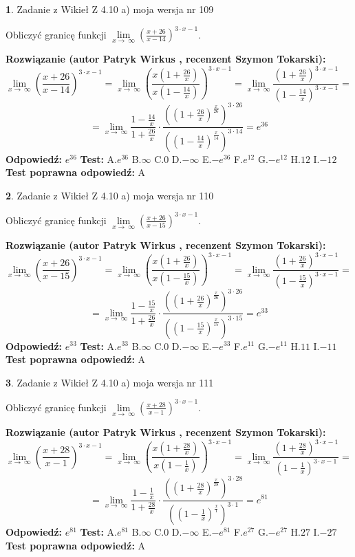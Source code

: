 \documentclass[12pt, a4paper]{article}
\theoremstyle{definition} %
\newtheorem{zad}{}
\newcommand{\zadStart}[1]{\begin{zad}#1\newline}
\newcommand{\zadStop}{\end{zad}}
\newcommand{\rozwStart}[2]{\noindent \textbf{Rozwiązanie (autor #1 , recenzent #2): }\newline}
\newcommand{\rozwStop}{\newline}
\newcommand{\odpStart}{\noindent \textbf{Odpowiedź:}\newline}
\newcommand{\odpStop}{\newline}
\newcommand{\testStart}{\noindent \textbf{Test:}\newline}
\newcommand{\testStop}{\newline}
\newcommand{\kluczStart}{\noindent \textbf{Test poprawna odpowiedź:}\newline}
\newcommand{\kluczStop}{\newline}
\begin{document}
\zadStart{Zadanie z Wikieł Z 4.10 a) moja wersja nr 109}

Obliczyć granicę funkcji  $\lim\limits_{x\to\ \infty}(\frac{x+26}{x-14})^{3\cdot x-1}$.
\zadStop
\rozwStart{Patryk Wirkus}{Szymon Tokarski}
$$\lim\limits_{x\to\ \infty}(\frac{x+26}{x-14})^{3\cdot x-1} = \lim\limits_{x\to\ \infty}(\frac{x(1+\frac{26}{x})}{x(1-\frac{14}{x})})^{3\cdot x-1}=\lim\limits_{x\to\ \infty}\frac{(1+\frac{26}{x})^{3\cdot x-1}}{(1-\frac{14}{x})^{3\cdot x-1}}=$$
$$=\lim\limits_{x\to\ \infty}\frac{1-\frac{14}{x}}{1+\frac{26}{x}}\cdot\frac{((1+\frac{26}{x})^{\frac{x}{26}})^{3\cdot26}}{((1-\frac{14}{x})^{\frac{x}{14}})^{3\cdot14}}=e^{36}$$
\rozwStop
\odpStart
$e^{36}$
\odpStop
\testStart
A.$e^{36}$ B.$\infty$ C.$0$ D.$-\infty$ E.$-e^{36}$
F.$e^{12}$ G.$-e^{12}$
H.$12$
I.$-12$
\testStop
\kluczStart
A
\kluczStop



\zadStart{Zadanie z Wikieł Z 4.10 a) moja wersja nr 110}

Obliczyć granicę funkcji  $\lim\limits_{x\to\ \infty}(\frac{x+26}{x-15})^{3\cdot x-1}$.
\zadStop
\rozwStart{Patryk Wirkus}{Szymon Tokarski}
$$\lim\limits_{x\to\ \infty}(\frac{x+26}{x-15})^{3\cdot x-1} = \lim\limits_{x\to\ \infty}(\frac{x(1+\frac{26}{x})}{x(1-\frac{15}{x})})^{3\cdot x-1}=\lim\limits_{x\to\ \infty}\frac{(1+\frac{26}{x})^{3\cdot x-1}}{(1-\frac{15}{x})^{3\cdot x-1}}=$$
$$=\lim\limits_{x\to\ \infty}\frac{1-\frac{15}{x}}{1+\frac{26}{x}}\cdot\frac{((1+\frac{26}{x})^{\frac{x}{26}})^{3\cdot26}}{((1-\frac{15}{x})^{\frac{x}{15}})^{3\cdot15}}=e^{33}$$
\rozwStop
\odpStart
$e^{33}$
\odpStop
\testStart
A.$e^{33}$ B.$\infty$ C.$0$ D.$-\infty$ E.$-e^{33}$
F.$e^{11}$ G.$-e^{11}$
H.$11$
I.$-11$
\testStop
\kluczStart
A
\kluczStop



\zadStart{Zadanie z Wikieł Z 4.10 a) moja wersja nr 111}

Obliczyć granicę funkcji  $\lim\limits_{x\to\ \infty}(\frac{x+28}{x-1})^{3\cdot x-1}$.
\zadStop
\rozwStart{Patryk Wirkus}{Szymon Tokarski}
$$\lim\limits_{x\to\ \infty}(\frac{x+28}{x-1})^{3\cdot x-1} = \lim\limits_{x\to\ \infty}(\frac{x(1+\frac{28}{x})}{x(1-\frac{1}{x})})^{3\cdot x-1}=\lim\limits_{x\to\ \infty}\frac{(1+\frac{28}{x})^{3\cdot x-1}}{(1-\frac{1}{x})^{3\cdot x-1}}=$$
$$=\lim\limits_{x\to\ \infty}\frac{1-\frac{1}{x}}{1+\frac{28}{x}}\cdot\frac{((1+\frac{28}{x})^{\frac{x}{28}})^{3\cdot28}}{((1-\frac{1}{x})^{\frac{x}{1}})^{3\cdot1}}=e^{81}$$
\rozwStop
\odpStart
$e^{81}$
\odpStop
\testStart
A.$e^{81}$ B.$\infty$ C.$0$ D.$-\infty$ E.$-e^{81}$
F.$e^{27}$ G.$-e^{27}$
H.$27$
I.$-27$
\testStop
\kluczStart
A
\kluczStop
\end{document}
